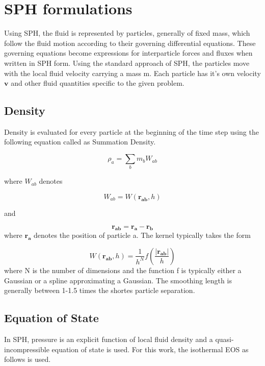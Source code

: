 \chapter{SPH formulations}

Using SPH, the fluid is represented by particles, generally of fixed mass, which follow the fluid motion according to their governing differential equations. These governing equations become expressions for interparticle forces and fluxes when written in SPH form. Using the standard approach of SPH, the particles move with the local fluid velocity carrying a mass m. Each particle has it's own velocity $\mathbf{v}$ and other fluid quantities specific to the given problem. 

\section{Density}

Density is evaluated for every particle at the beginning of the time step using the following equation called as Summation Density. 

\begin{equation}
 \rho_a = \sum_b m_b W_{ab}
\end{equation}

\noindent
where $W_{ab}$ denotes

\begin{equation}
 W_{ab} = W(\mathbf{r_{ab}}, h)
\end{equation}

\noindent
and

\begin{equation}
 \mathbf{r_{ab}} = \mathbf{r_a} - \mathbf{r_b}
\end{equation}
\noindent
where $\mathbf{r_a}$ denotes the position of particle a. The kernel typically takes the form

\begin{equation}
 W(\mathbf{r_{ab}}, h)= \frac{1}{h^N} f\left( \frac{\left|\mathbf{r_{ab}} \right|}{h}\right)
\end{equation}
\noindent
where N is the number of dimensions and the function f is typically either a Gaussian or a spline approximating a Gaussian. The smoothing length is generally between 1-1.5 times the shortes particle separation. 

\section{Equation of State}
In SPH, pressure is an explicit function of local fluid density and a quasi-incompressible equation of state is used. For this work, the isothermal EOS as follows is used.

